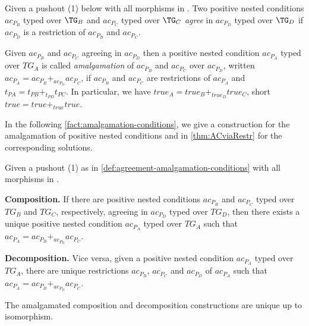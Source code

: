 \begin{definition}\label{def:agreement-amalgamation-conditions}
	Given a pushout (1) below with all morphisms in \M. 
	Two positive nested conditions $ac_{P_B}$ typed over $\TG_B$ and $ac_{P_C}$ typed over $\TG_C$ \emph{agree} in $ac_{P_D}$
	typed over $\TG_D$ if $ac_{P_D}$ is a restriction of $ac_{P_B}$ and $ac_{P_C}$.
	
	Given $ac_{P_B}$ and $ac_{P_C}$ agreeing in $ac_{P_D}$ then a positive nested condition 
	$ac_{P_A}$ typed over $TG_A$ is called \emph{amalgamation} of $ac_{P_B}$ and $ac_{P_C}$ over
	$ac_{P_D}$, written $ac_{P_A} = ac_{P_B} +_{ac_{P_D}} ac_{P_C}$, if $ac_{P_B}$ and $ac_{P_C}$ are restrictions of $ac_{P_A}$
	and $t_{PA} = t_{PB} +_{t_{PD}} t_{PC}$.
	In particular, we have $true_A = true_B +_{true_D} true_C$, short $true = true +_{true} true$.

\end{definition}

In the following \autoref{fact:amalgamation-conditions}, we give a construction for the amalgamation of positive nested conditions and in \autoref{thm:ACviaRestr} for the corresponding solutions.

\begin{fact}\label{fact:amalgamation-conditions}
	Given a pushout (1) as in \autoref{def:agreement-amalgamation-conditions} with all morphisms in \M. 
	\begin{description}
		\item \textbf{Composition.} 
			If there are positive nested conditions $ac_{P_B}$ and $ac_{P_C}$ typed over $TG_B$ and $TG_C$, respectively,
			agreeing in $ac_{P_D}$ typed over $TG_D$, then there exists a unique positive nested condition $ac_{P_A}$ typed over $TG_A$ such that 
			$ac_{P_A} = ac_{P_B} +_{ac_{P_D}} ac_{P_C}$.
		\item \textbf{Decomposition.}
			Vice versa, given a positive nested condition $ac_{P_A}$ typed over $TG_A$, there are unique restrictions $ac_{P_B}$, $ac_{P_C}$ and $ac_{P_D}$ 
			of $ac_{P_A}$ such that $ac_{P_A} = ac_{P_B} +_{ac_{P_D}} ac_{P_C}$.
	\end{description}
	The amalgamated composition and decomposition constructions are unique up to isomorphism.
	
\end{fact}

